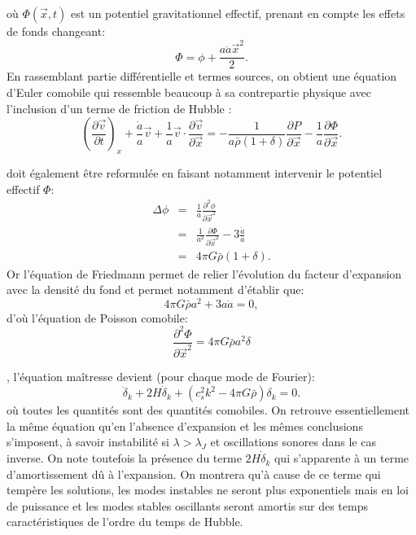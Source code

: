  où $\Phi(\vec x,t)$ est un potentiel gravitationnel effectif, prenant en compte les effets de fonds changeant:
 \begin{equation}
 \Phi= \phi+\frac{a\ddot a {\vec x}^2}{2}.
 \end{equation}
En rassemblant partie différentielle et termes sources, on obtient une équation d'Euler comobile qui ressemble beaucoup à sa contrepartie physique avec l'inclusion d'un terme de friction de Hubble :
\begin{equation}
\left(\frac{\partial \vec v}{\partial t}\right)_x +\frac{\dot a}{a}\vec v+\frac{1}{a}\vec v \cdot \frac{\partial \vec v}{\partial \vec x}=-\frac{1}{a\bar \rho (1+\delta)}\frac{\partial P}{\partial \vec x}-\frac{1}{a}\frac{\partial \Phi}{\partial \vec x}.
\end{equation}

 doit également être reformulée en faisant notamment intervenir le potentiel effectif $\Phi$:
\begin{eqnarray}
\Delta \phi &=&\frac{1}{a}\frac{\partial^2 \phi}{\partial \vec x^2}\\
&=&\frac{1}{a^2}\frac{\partial \Phi}{\partial \vec x^2}-3\frac{\ddot a}{a}\\
&=&4\pi G \bar \rho(1+\delta).
\end{eqnarray}
Or l'équation de Friedmann permet de relier l'évolution du facteur d'expansion avec la densité du fond et permet notamment d'établir que:
\begin{equation}
4\pi G \bar \rho a^2+3 a \ddot a=0,
\end{equation}
 d'où l'équation de Poisson comobile:
 \begin{equation}
 \frac{\partial^2 \Phi}{\partial \vec x^2}=4\pi G \bar \rho a^2 \delta
 \end{equation}
 
 , l'équation maîtresse devient (pour chaque mode de Fourier):
 \begin{equation}
  \ddot \delta_k +2H\dot \delta_k+ (c_s^2k ^2-4\pi G \bar \rho) \delta_k= 0.
  \label{e:epert}
 \end{equation}
 où toutes les quantités sont des quantités comobiles. On retrouve essentiellement la même équation qu'en l'absence d'expansion et les mêmes conclusions s'imposent, à savoir instabilité si $\lambda >\lambda_J$ et oscillations sonores dans le cas inverse. On note toutefois la présence du terme $2H\dot \delta_k$ qui s'apparente à un terme d'amortissement dû à l'expansion. On montrera qu'à cause de ce terme qui tempère les solutions, les modes instables ne seront plus exponentiels mais en loi de puissance et les modes stables oscillants seront amortis sur des temps caractéristiques de l'ordre du temps de Hubble.
 
